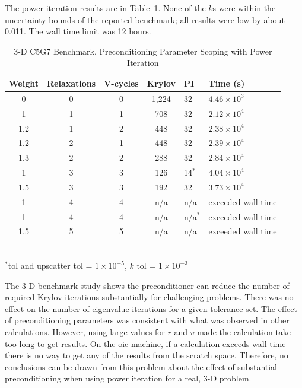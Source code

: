 The power iteration results are in Table~\ref{table:3-D c5g7}. None of the $k$s were within the uncertainty bounds of the reported benchmark; all results were low by about 0.011. The wall time limit was 12 hours. 
%
\begin{table}[!h]
\caption{3-D C5G7 Benchmark, Preconditioning Parameter Scoping with Power Iteration}
\begin{center}
\begin{tabular}{c c c c l l}
\hline
Weight & Relaxations & V-cycles & Krylov & PI & Time (s) \\[0.5ex]
\hline
0    & 0 & 0 & 1,224 & 32 & $4.46 \times 10^{3}$ \\
1    & 1 & 1 & 708    & 32 & $2.12 \times 10^{4}$ \\
1.2 & 1 & 2 & 448    & 32 & $2.38 \times 10^{4}$ \\
1.2 & 2 & 1 & 448    & 32 & $2.39 \times 10^{4}$ \\
1.3 & 2 & 2 & 288    & 32 & $2.84 \times 10^{4}$ \\
1    & 3 & 3 & 126    & 14$^{*}$  & $4.04 \times 10^{4}$ \\
1.5 & 3 & 3 & 192    & 32 & $3.73 \times 10^{4}$ \\
1    & 4 & 4 & n/a     & n/a          & exceeded wall time \\
1    & 4 & 4 & n/a     & n/a$^{*}$ & exceeded wall time \\
1.5 & 5 & 5 & n/a     & n/a          & exceeded wall time \\
\hline 
\end{tabular}\\
$^{*}$tol and upscatter tol = $1 \times 10^{-5}$, $k$ tol = $1 \times 10^{-3}$
\end{center}
\label{table:3-D c5g7}
\end{table}

The 3-D benchmark study shows the preconditioner can reduce the number of required Krylov iterations substantially for challenging problems. There was no effect on the number of eigenvalue iterations for a given tolerance set. The effect of preconditioning parameters was consistent with what was observed in other calculations. However, using large values for $r$ and $v$ made the calculation take too long to get results. On the oic machine, if a calculation exceeds wall time there is no way to get any of the results from the scratch space. Therefore, no conclusions can be drawn from this problem about the effect of substantial preconditioning when using power iteration for a real, 3-D problem. 

